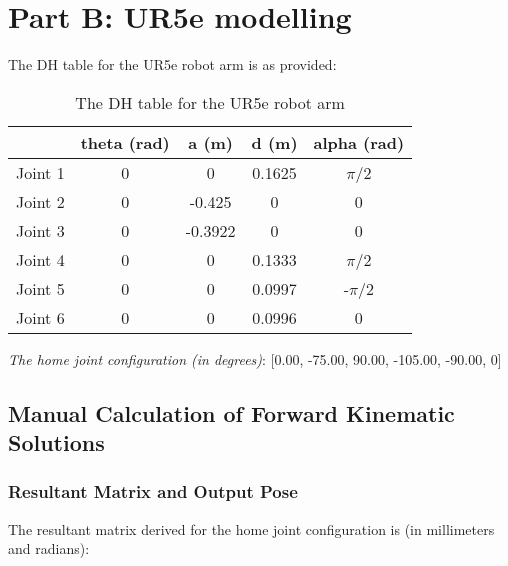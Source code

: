 \section{Part B: UR5e modelling}

The DH table for the UR5e robot arm is as provided:
\begin{table}[H]
    \centering
    \begin{tabular}{|c|c|c|c|c|}
        \hline
                & \textbf{theta (rad)} & \textbf{a (m)} & \textbf{d (m)} & \textbf{alpha (rad)} \\ \hline
        Joint 1 & 0                    & 0              & 0.1625         & $\pi$/2              \\ \hline
        Joint 2 & 0                    & -0.425         & 0              & 0                    \\ \hline
        Joint 3 & 0                    & -0.3922        & 0              & 0                    \\ \hline
        Joint 4 & 0                    & 0              & 0.1333         & $\pi$/2              \\ \hline
        Joint 5 & 0                    & 0              & 0.0997         & -$\pi$/2             \\ \hline
        Joint 6 & 0                    & 0              & 0.0996         & 0                    \\ \hline
    \end{tabular}
    \caption{The DH table for the UR5e robot arm}
    \label{table:DH-UR5e default}
\end{table}

\textit{The home joint configuration (in degrees)}: [0.00, -75.00, 90.00, -105.00, -90.00, 0]

\subsection{Manual Calculation of Forward Kinematic Solutions}
\subsubsection{Resultant Matrix and Output Pose}
The resultant matrix derived for the home joint configuration is (in millimeters and radians):

